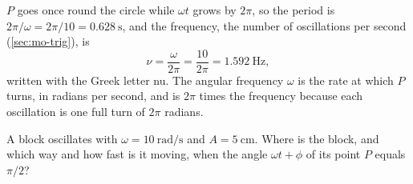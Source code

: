 $P$ goes once round the circle while $\omega t$ grows by $2\pi$, so the
period is $2\pi/\omega = 2\pi/10 = \SI{0.628}{\second}$, and the
frequency, the number of oscillations per second (\cref{sec:mo-trig}),
is
\begin{equation*}
   \nu = \frac{\omega}{2\pi} = \frac{10}{2\pi} = \SI{1.592}{\hertz} ,
\end{equation*}
written with the Greek letter nu. The angular frequency $\omega$ is the
rate at which $P$ turns, in radians per second, and is $2\pi$ times the
frequency because each oscillation is one full turn of $2\pi$ radians.

\begin{selfcheck}
A block oscillates with $\omega = \SI{10}{\radian\per\second}$ and $A =
\SI{5}{\centi\metre}$. Where is the block, and which way and how fast is
it moving, when the angle $\omega t + \phi$ of its point $P$ equals
$\pi/2$?
\end{selfcheck}
